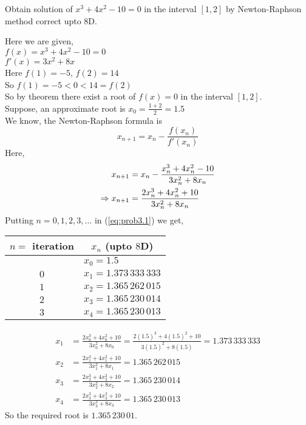 \documentclass[12pt,class=book,crop=false]{standalone}
\begin{document}
\begin{prob}
    Obtain solution of \( x^3+4x^2-10=0 \) in the interval \( [1,2] \) by Newton-Raphson method correct upto \( 8 \)D.
\end{prob}
\begin{soln}
    Here we are given,\\
    \indent \( f(x)=x^3+4x^2-10=0 \)\\
    \indent \( f'(x)=3x^2+8x \)\\
    Here \( f(1)=-5,\,f(2)=14 \)\\
    So \( f(1)=-5<0<14=f(2)\)\\
    So by theorem there exist a root of \( f(x)=0 \) in the interval \( [1,2] \).\\
    Suppose, an approximate root is \( x_0=\frac{1+2}{2}=1.5 \)\\
    We know, the Newton-Raphson formula is
    \[
        x_{n+1}=x_n-\frac{f(x_n)}{f'(x_n)}
    \]
    Here,
    \begin{align}
        x_{n+1}             & =x_n-\frac{x_n^3+4x_n^2-10}{3x_n^2+8x_n}\notag          \\
        \Rightarrow x_{n+1} & =\frac{2x_n^3+4x_n^2+10}{3x_n^2+8x_n}\label{eq:prob3.1}
    \end{align}
    \newpage
    Putting \( n=0,1,2,3,\dots \) in (\ref{eq:prob3.1}) we get,
    \begin{center}
        \begin{tabular}{cl}
            \toprule
            \( n= \) iteration & \multicolumn{1}{c}{\( x_n  \) (upto \( 8 \)D)} \\\midrule
                               & \( x_0 = 1.5\)                                 \\
            \(0\)              & \( x_1 = 1.373\,333\,333\)                     \\
            \( 1 \)            & \(x_2= 1.365\,262\,015  \)                     \\
            \( 2 \)            & \(x_3= 1.365\,230\,014  \)                     \\
            \( 3 \)            & \( x_4= 1.365\,230\,013 \)                     \\\bottomrule
        \end{tabular}
    \end{center}
    \begin{align*}
        x_1 & =\frac{2x_0^3+4x_0^2+10}{3x_0^2+8x_0}=\frac{2(1.5)^3+4(1.5)^2+10}{3(1.5)^2+8(1.5)}=1.373\,333\,333 \\
        x_2 & =\frac{2x_1^3+4x_1^2+10}{3x_1^2+8x_1}=1.365\,262\,015                                              \\
        x_3 & =\frac{2x_2^3+4x_2^2+10}{3x_2^2+8x_2}=1.365\,230\,014                                              \\
        x_4 & =\frac{2x_3^3+4x_3^2+10}{3x_3^2+8x_3}=1.365\,230\,013
    \end{align*}
    So the required root is \( 1.365\,230\,01 \).\\
\end{soln}
\end{document}
